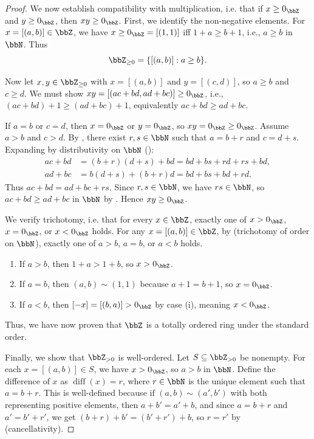 \begin{proof}
We now establish compatibility with multiplication, i.e. that if $x \geq 0_\bbZ$ and $y \geq 0_\bbZ$, then $xy \geq 0_\bbZ$. First, we identify the non-negative elements. For $x = [(a,b)] \in \bbZ$, we have $x \geq 0_\bbZ = [(1,1)]$ iff $1 + a \geq b + 1$, i.e., $a \geq b$ in $\bbN$. Thus
$$\bbZ_{\geq 0} = \{[(a,b)] : a \geq b\}.$$

Now let $x, y \in \bbZ_{\geq 0}$ with $x = [(a,b)]$ and $y = [(c,d)]$, so $a \geq b$ and $c \geq d$. We must show $xy = [(ac+bd, ad+bc)] \geq 0_\bbZ$, i.e., $(ac+bd) + 1 \geq (ad+bc) + 1$, equivalently $ac + bd \geq ad + bc$.

If $a = b$ or $c = d$, then $x = 0_\bbZ$ or $y = 0_\bbZ$, so $xy = 0_\bbZ \geq 0_\bbZ$.
Assume $a > b$ and $c > d$. By , there exist $r, s \in \bbN$ such that $a = b + r$ and $c = d + s$.
Expanding by distributivity on $\bbN$ ():
\begin{align*}
ac + bd &= (b+r)(d+s) + bd = bd + bs + rd + rs + bd, \\
ad + bc &= b(d+s) + (b+r)d = bd + bs + bd + rd.
\end{align*}
Thus $ac + bd = ad + bc + rs$. Since $r, s \in \bbN$, we have $rs \in \bbN$, so $ac + bd \geq ad + bc$ in $\bbN$ by . Hence $xy \geq 0_\bbZ$.

We verify trichotomy, i.e. that for every $x \in \bbZ$, exactly one of $x > 0_\bbZ$, $x = 0_\bbZ$, or $x < 0_\bbZ$ holds. For any $x = [(a,b)] \in \bbZ$, by  (trichotomy of order on $\bbN$), exactly one of $a > b$, $a = b$, or $a < b$ holds.
\begin{enumerate}
    \item If $a > b$, then $1 + a > 1 + b$, so $x > 0_\bbZ$.
    \item If $a = b$, then $(a,b) \sim (1,1)$ because $a + 1 = b + 1$, so $x = 0_\bbZ$.
    \item If $a < b$, then $[-x] = [(b,a)] > 0_\bbZ$ by case (i), meaning $x < 0_\bbZ$.
\end{enumerate}
Thus, we have now proven that $\bbZ$ is a totally ordered ring under the standard order.

Finally, we show that $\bbZ_{> 0}$ is well-ordered. Let $S \subseteq \bbZ_{> 0}$ be nonempty. For each $x = [(a,b)] \in S$, we have $x > 0_\bbZ$, so $a > b$ in $\bbN$. Define the difference of $x$ as $\operatorname{diff}(x) = r$, where $r \in \bbN$ is the unique element such that $a = b + r$. This is well-defined because if $(a,b) \sim (a',b')$ with both representing positive elements, then $a + b' = a' + b$, and since $a = b + r$ and $a' = b' + r'$, we get $(b+r) + b' = (b'+r') + b$, so $r = r'$ by  (cancellativity).


\end{proof}
